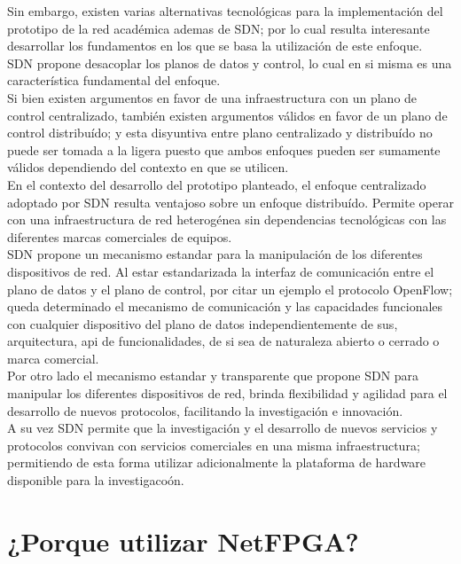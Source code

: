 Sin embargo, existen varias alternativas tecnol\'ogicas para la implementaci\'on del prototipo de la red acad\'emica ademas de SDN; por lo cual resulta interesante desarrollar los fundamentos en los que se basa la utilizaci\'on de este enfoque.\\  

SDN propone desacoplar los planos de datos y control, lo cual en si misma es una caracter\'istica fundamental del enfoque.\\ 
Si bien existen argumentos en favor de una infraestructura con un plano de control centralizado, tambi\'en existen argumentos v\'alidos en favor de un plano de control distribu\'ido; y esta disyuntiva entre plano centralizado y distribu\'ido no puede ser tomada a la ligera puesto que ambos enfoques pueden ser sumamente v\'alidos dependiendo del contexto en que se utilicen.\\

En el contexto del desarrollo del prototipo planteado, el enfoque centralizado adoptado por SDN resulta ventajoso sobre un enfoque distribu\'ido. Permite operar con una infraestructura de red heterog\'enea sin dependencias tecnol\'ogicas con las diferentes marcas comerciales de equipos.\\

SDN propone un mecanismo estandar para la manipulaci\'on de los diferentes dispositivos de red. Al estar estandarizada la interfaz de comunicaci\'on entre el plano de datos y el plano de control, por citar un ejemplo el protocolo OpenFlow; queda determinado el mecanismo de comunicaci\'on y las capacidades funcionales con cualquier dispositivo del plano de datos independientemente de sus, arquitectura, api de funcionalidades, de si sea de naturaleza abierto o cerrado o marca comercial.\\ 

Por otro lado el mecanismo estandar y transparente que propone SDN para manipular los diferentes dispositivos de red, brinda flexibilidad y agilidad para el desarrollo de nuevos protocolos, facilitando la investigaci\'on e innovaci\'on.\\

A su vez SDN permite que la investigaci\'on y el desarrollo de nuevos servicios y protocolos convivan con servicios comerciales en una misma infraestructura; permitiendo de esta forma utilizar adicionalmente la plataforma de hardware disponible para la investigaco\'on. 


\section[¿Porque utilizar NetFPGA?]{¿Porque utilizar NetFPGA?}

